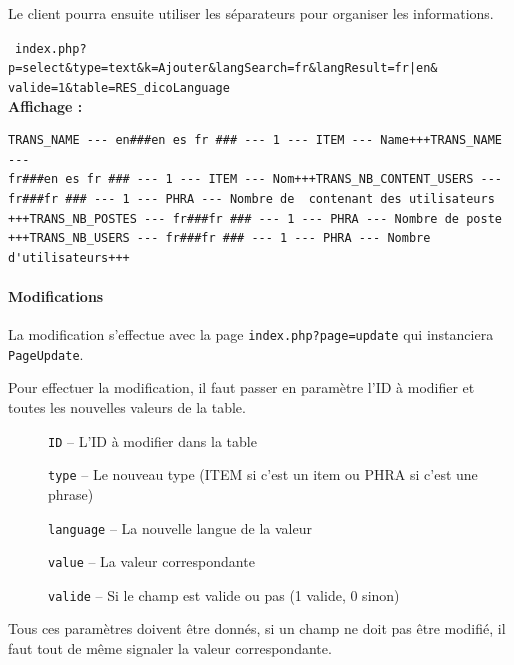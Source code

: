             Le client pourra ensuite utiliser les séparateurs pour organiser les informations.
            \begin{exemple}
                ~\texttt{index.php?p=select\&type=text\&k=Ajouter\&langSearch=fr\&langResult=fr|en\&\\
                valide=1\&table=RES\_dicoLanguage}\\

                \textbf{Affichage : }
                \begin{verbatim}
TRANS_NAME --- en###en es fr ### --- 1 --- ITEM --- Name+++TRANS_NAME ---
fr###en es fr ### --- 1 --- ITEM --- Nom+++TRANS_NB_CONTENT_USERS ---
fr###fr ### --- 1 --- PHRA --- Nombre de  contenant des utilisateurs
+++TRANS_NB_POSTES --- fr###fr ### --- 1 --- PHRA --- Nombre de poste
+++TRANS_NB_USERS --- fr###fr ### --- 1 --- PHRA --- Nombre d'utilisateurs+++
                \end{verbatim}
            \end{exemple}
        \paragraph{Modifications}

        La modification s'effectue avec la page \texttt{index.php?page=update} qui instanciera \texttt{PageUpdate}.

        Pour effectuer la modification, il faut passer en paramètre l'ID à modifier et toutes les nouvelles valeurs de la table.
                    \begin{description}
                \item[] \texttt{ID} -- L'ID à modifier dans la table
                \item[] \texttt{type} -- Le nouveau type (ITEM si c'est un item ou PHRA si c'est une phrase)
                \item[] \texttt{language} -- La nouvelle langue de la valeur
                \item[] \texttt{value} -- La valeur correspondante
                \item[] \texttt{valide} -- Si le champ est valide ou pas (1 valide, 0 sinon)                                                                        \end{description}

        Tous ces paramètres doivent être donnés, si un champ ne doit pas être modifié, il faut tout de même
        signaler la valeur correspondante.


